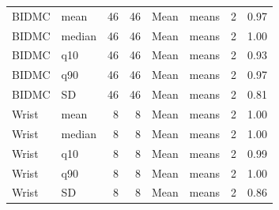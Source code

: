 \begin{longtable}{p{1.95cm}p{4.25cm}rrp{1.7cm}p{2.1cm}rr}
BIDMC & mean & 46 & 46 & Mean & means & 2 & 0.97\\
BIDMC & median & 46 & 46 & Mean & means & 2 & 1.00\\
BIDMC & q10 & 46 & 46 & Mean & means & 2 & 0.93\\
BIDMC & q90 & 46 & 46 & Mean & means & 2 & 0.97\\
BIDMC & SD & 46 & 46 & Mean & means & 2 & 0.81\\
Wrist & mean & 8 & 8 & Mean & means & 2 & 1.00\\
Wrist & median & 8 & 8 & Mean & means & 2 & 1.00\\
Wrist & q10 & 8 & 8 & Mean & means & 2 & 0.99\\
Wrist & q90 & 8 & 8 & Mean & means & 2 & 1.00\\
Wrist & SD & 8 & 8 & Mean & means & 2 & 0.86\\
\bottomrule\end{longtable}
\normalsize
